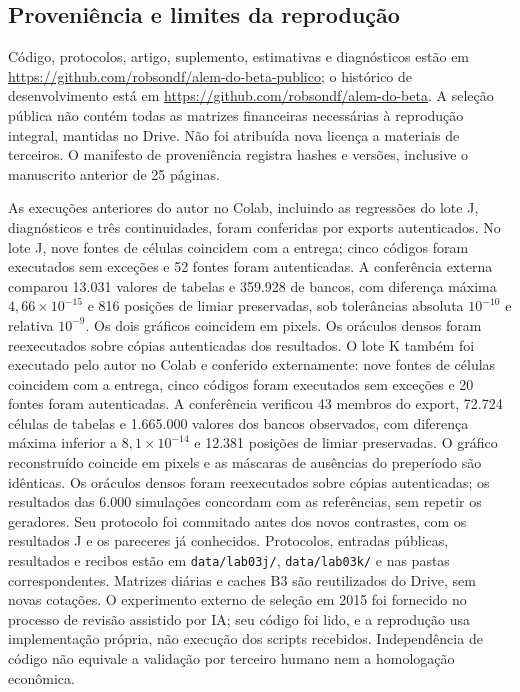 \documentclass[12 pt]{article}
\begin{document}
\subsection{Proveniência e limites da reprodução}
Código, protocolos, artigo, suplemento, estimativas e diagnósticos
estão em \url{https://github.com/robsondf/alem-do-beta-publico};
o histórico de desenvolvimento está em \url{https://github.com/robsondf/alem-do-beta}.
A seleção pública não contém todas as matrizes financeiras necessárias
à reprodução integral, mantidas no Drive. Não foi atribuída nova licença
a materiais de terceiros. O manifesto de proveniência registra hashes
e versões, inclusive o manuscrito anterior de 25 páginas.

As execuções anteriores do autor no Colab, incluindo as regressões do lote J,
diagnósticos e três continuidades, foram conferidas por exports
autenticados. No lote J, nove fontes de células coincidem
com a entrega; cinco códigos foram executados sem exceções e 52 fontes
foram autenticadas. A conferência externa comparou 13.031 valores de
tabelas e 359.928 de bancos, com diferença máxima $4,66\times10^{-15}$
e 816 posições de limiar preservadas, sob tolerâncias absoluta $10^{-10}$
e relativa $10^{-9}$. Os dois gráficos coincidem em pixels. Os oráculos
densos foram reexecutados sobre cópias autenticadas dos resultados.
O lote K também foi executado pelo autor no Colab e conferido externamente:
nove fontes de células coincidem com a entrega, cinco códigos foram
executados sem exceções e 20 fontes foram autenticadas. A conferência
verificou 43 membros do export, 72.724 células de tabelas e 1.665.000
valores dos bancos observados, com diferença máxima inferior a
$8,1\times10^{-14}$ e 12.381 posições de limiar preservadas.
O gráfico reconstruído coincide em pixels e as máscaras de ausências
do preperíodo são idênticas. Os oráculos densos foram reexecutados sobre
cópias autenticadas; os resultados das 6.000 simulações concordam com
as referências, sem repetir os geradores. Seu protocolo foi commitado antes dos novos contrastes,
com os resultados J e os pareceres já conhecidos. Protocolos, entradas
públicas, resultados e recibos estão em \texttt{data/lab03j/},
\texttt{data/lab03k/} e nas pastas correspondentes. Matrizes diárias
e caches B3 são reutilizados do Drive, sem novas cotações. O experimento
externo de seleção em 2015 foi fornecido no processo de revisão assistido
por IA; seu código foi lido, e a reprodução usa implementação própria,
não execução dos scripts recebidos. Independência de código não equivale
a validação por terceiro humano nem a homologação econômica.
\end{document}
